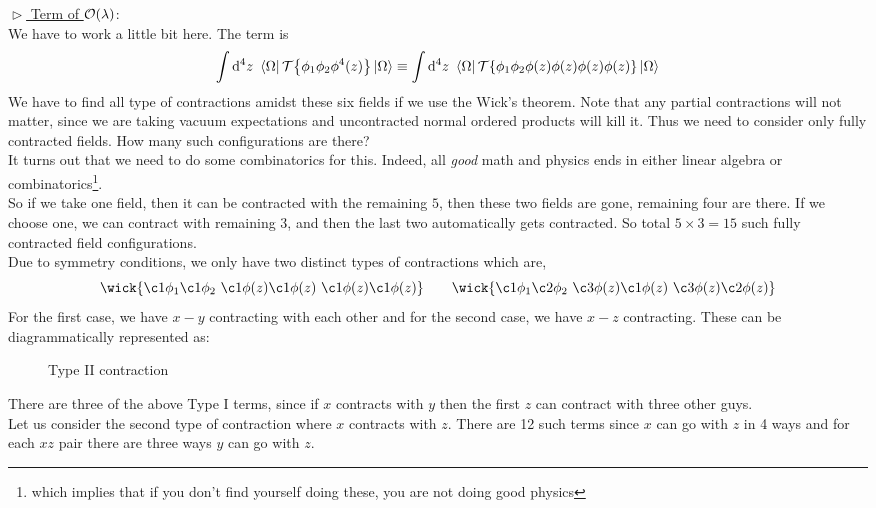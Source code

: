 \noindent
$\vartriangleright $\underline{ Term of $\mathcal O(\lambda)$}:\\[0.2cm]
We have to work a little bit here. The term is 
$$\int \dd^4 z \ \bra{\Omega}\mathcal T\qty{\phi_1 \phi_2 \phi^4(z)}\ket{\Omega} \equiv \int \dd^4 z \ \bra{\Omega}\mathcal T\qty{\phi_1 \phi_2 \phi(z)\phi(z)\phi(z)\phi(z)}\ket{\Omega}$$
We have to find all type of contractions amidst these six fields if we use the Wick's theorem. Note that any partial contractions will not matter, since we are taking vacuum expectations and uncontracted normal ordered products will kill it. Thus we need to consider only fully contracted fields. How many such configurations are there? \\[0.2cm]
It turns out that we need to do some combinatorics for this. Indeed, all \textit{good} math and physics ends in either linear algebra or combinatorics\footnote{which implies that if you don't find yourself doing these, you are not doing good physics}. \\[0.2cm]So if we take one field, then it can be contracted with the remaining $5$, then these two fields are gone, remaining four are there. If we choose one, we can contract with remaining 3, and then the last two automatically gets contracted. So total $5\times 3 = 15$ such fully contracted field configurations.\\[0.2cm]
Due to symmetry conditions, we only have two distinct types of contractions which are, 
$$\wick{\c1 \phi_1 \c1 \phi_2\ \c1 \phi(z) \c1 \phi(z)\ \c1 \phi(z) \c1 \phi(z)}\qquad \wick{\c1 \phi_1 \c2 \phi_2\ \c3 \phi(z) \c1 \phi(z)\ \c3 \phi(z) \c2 \phi(z)}$$
For the first case, we have $x-y$ contracting with each other and for the second case, we have $x-z$ contracting. These can be diagrammatically represented as:
\begin{figure}[H]
    \centering 
 \begin{minipage}[b]{0.4\textwidth}
        \centering 
        
        \caption{Type I contraction}
\end{minipage}
    \hspace{0.2cm}
     \begin{minipage}[b]{0.45\textwidth}
      \centering 
      
      \caption{Type II contraction}
     \end{minipage}
\end{figure} 
\noindent
There are three of the above Type I terms, since if $x$ contracts with $y$ then the first $z$ can contract with three other guys.\\[0.2cm] Let us consider the second type of contraction where $x$ contracts with $z$. There are 12 such terms since $x$ can go with $z$ in 4 ways and for each $xz$ pair there are three ways $y$ can go with $z$.    
